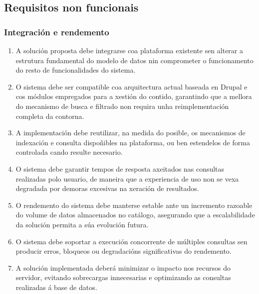 \documentclass[%
    a4paper,               %
    twoside,                %
    parskip=full,           %
    10pt,                   %
    titlepage=on,           %
    captions=tableabove,    %
]{article}                  %
\begin{document}
\subsection{Requisitos non funcionais}

\subsubsection{Integración e rendemento}
\begin{enumerate}
    \item A solución proposta debe integrarse coa plataforma existente sen alterar a estrutura fundamental do modelo de datos nin comprometer o funcionamento do resto de funcionalidades do sistema.

    \item O sistema debe ser compatible coa arquitectura actual baseada en Drupal e cos módulos empregados para a xestión do contido, garantindo que a mellora do mecanismo de busca e filtrado non requira unha reimplementación completa da contorna.

    \item A implementación debe reutilizar, na medida do posible, os mecanismos de indexación e consulta dispoñibles na plataforma, ou ben estendelos de forma controlada cando resulte necesario.

    \item O sistema debe garantir tempos de resposta axeitados nas consultas realizadas polo usuario, de maneira que a experiencia de uso non se vexa degradada por demoras excesivas na xeración de resultados.

    \item O rendemento do sistema debe manterse estable ante un incremento razoable do volume de datos almacenados no catálogo, asegurando que a escalabilidade da solución permita a súa evolución futura.

    \item O sistema debe soportar a execución concorrente de múltiples consultas sen producir erros, bloqueos ou degradacións significativas do rendemento.

    \item A solución implementada deberá minimizar o impacto nos recursos do servidor, evitando sobrecargas innecesarias e optimizando as consultas realizadas á base de datos.
\end{enumerate}
\end{document}
